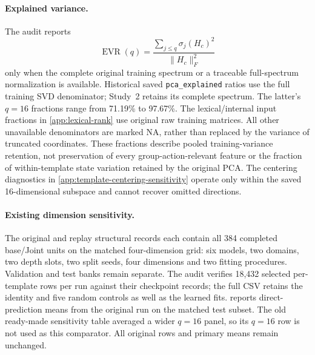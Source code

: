 \paragraph{Explained variance.}
The audit reports
\[
 \operatorname{EVR}(q)=\frac{\sum_{j\le q}\sigma_j(H_c)^2}{\|H_c\|_F^2}
\]
only when the complete original training spectrum or a traceable full-spectrum normalization is available. Historical saved \texttt{pca\_explained} ratios use the full training SVD denominator; Study~2 retains its complete spectrum. The latter's $q=16$ fractions range from 71.19\% to 97.67\%. The lexical/internal input fractions in \cref{app:lexical-rank} use original raw training matrices. All other unavailable denominators are marked NA, rather than replaced by the variance of truncated coordinates. These fractions describe pooled training-variance retention, not preservation of every group-action-relevant feature or the fraction of within-template state variation retained by the original PCA. The centering diagnostics in \cref{app:template-centering-sensitivity} operate only within the saved 16-dimensional subspace and cannot recover omitted directions.

\paragraph{Existing dimension sensitivity.}
The original and replay structural records each contain all 384 completed base/Joint units on the matched four-dimension grid: six models, two domains, two depth slots, two split seeds, four dimensions and two fitting procedures. Validation and test banks remain separate. The audit verifies 18,432 selected per-template rows per run against their checkpoint records; the full CSV retains the identity and five random controls as well as the learned fits.  reports direct-prediction means from the original run on the matched test subset. The old ready-made sensitivity table averaged a wider $q=16$ panel, so its $q=16$ row is not used as this comparator. All original rows and primary means remain unchanged.



